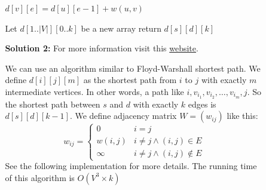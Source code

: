 \documentclass{book}
\begin{document}
\begin{enumerate}
\begin{enumerate}
\begin{itemize}
\begin{algorithm}[h!]
                        \begin{algorithmic}[1]
                                    \State $d[v][e] = d[u][e - 1] + w(u, v)$
                                \EndIf
                            \EndFunction
                        \end{algorithmic}                    
                        \begin{algorithmic}[1]
                            	\State Let $d[1..|V|][0..k]$ be a new array
                                \State {}
                                 
                                        \State {}
                                    \EndFor
                                \EndFor
                                \State return $d[s][d][k]$
                            \EndFunction
                        \end{algorithmic}
                    \end{algorithm}
                	\FloatBarrier
					\item[\textbf{Solution 2:}] For more information visit this \href{https://www.geeksforgeeks.org/shortest-path-exactly-k-edges-directed-weighted-graph/}{website}.
					\par We can use an algorithm similar to Floyd-Warshall shortest path. We define $d[i][j][m]$ as the shortest path from $i$ to $j$ with exactly $m$ intermediate vertices. In other words, a path like $i, v_{i_1}, v_{i_2}, \dots, v_{i_m}, j$. So the shortest path between $s$ and $d$ with exactly $k$ edges is $d[s][d][k - 1]$. We define adjacency matrix $W = (w_{ij})$ like this:
					\begin{equation*}
						w_{ij} = \begin{cases}
							0 & i = j \\
							w(i, j) & i \ne j \land (i, j) \in E \\
							\infty & i \ne j \land (i, j) \notin E
						\end{cases}
					\end{equation*}
					See the following implementation for more details. The running time of this algorithm is $O(V^3 \times k)$
                    \begin{algorithm}[h!]

\end{algorithm}
\end{itemize}
\end{enumerate}
\end{enumerate}
\end{document}
